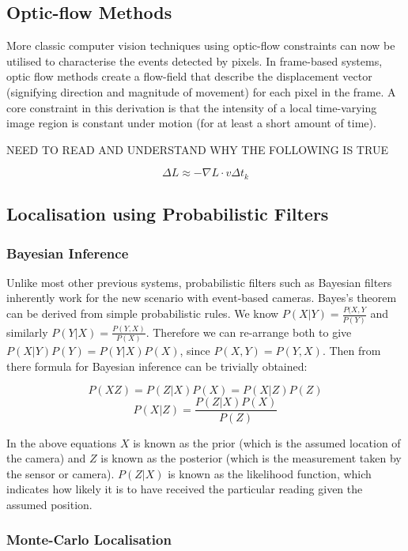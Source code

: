 \subsection{Optic-flow Methods}

More classic computer vision techniques using optic-flow constraints can now be utilised to characterise the events detected by pixels. In frame-based systems, optic flow methods create a flow-field that describe the displacement vector (signifying direction and magnitude of movement) for each pixel in the frame. A core constraint in this derivation is that the intensity of a local time-varying image region is constant under motion (for at least a short amount of time)\cite{GenerativeEventModel}.

\color{red} NEED TO READ AND UNDERSTAND WHY THE FOLLOWING IS TRUE \cite{GenerativeEventModel} \cite{EventBasedVisionASurvery} \color{black}

$$ \Delta L \approx -\nabla L \cdot v \Delta t_k $$

\subsection{Localisation using Probabilistic Filters}

\subsubsection{Bayesian Inference}

Unlike most other previous systems, probabilistic filters such as Bayesian filters inherently work for the new scenario with event-based cameras. Bayes's theorem can be derived from simple probabilistic rules\cite{BayesLaw}. We know $P(X|Y) = \frac{P(X, Y}{P(Y)} $ and similarly $ P(Y|X) = \frac{P(Y, X)}{P(X)} $. Therefore we can re-arrange both to give $ P(X|Y)P(Y) = P(Y|X)P(X) $, since $ P(X, Y) = P(Y, X) $. Then from there formula for Bayesian inference can be trivially obtained:

$$ P(XZ) = P(Z|X)P(X) = P(X|Z)P(Z) $$
$$ P(X|Z) = \frac{P(Z|X)P(X)}{P(Z)}$$

In the above equations $ X $ is known as the prior (which is the assumed location of the camera) and $ Z $ is known as the posterior (which is the measurement taken by the sensor or camera). $P(Z|X) $ is known as the likelihood function, which indicates how likely it is to have received the particular reading given the assumed position.

\subsubsection{Monte-Carlo Localisation}

